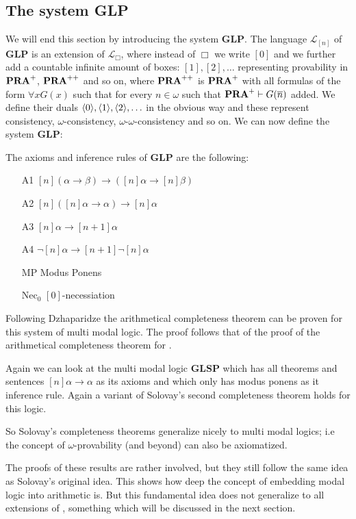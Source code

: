 \documentclass[../main.tex]{subfiles}
\begin{document}
\subsection{The system \textbf{GLP}}
We will end this section by introducing the system \textbf{GLP}.
The language $\mathcal{L}_{[n]}$ of \textbf{GLP} is an extension of
$\mathcal{L}_\Box$, where instead of $\Box$ we write $[0]$ and we further add
a countable infinite amount of boxes:
$[1],[2],\ldots$ representing provability in $\text{\textbf{PRA}}^+$, $\text{\textbf{PRA}}^{++}$ and so on,
where $\text{\textbf{PRA}}^{++}$ is  $\text{\textbf{PRA}}^+$ with all formulas of the form $\forall x G(x)$
such that for every $n\in\omega$ such that $\text{\textbf{PRA}}^+\vdash G(\overline n)$ added. We
define their duals $\langle 0\rangle,\langle 1\rangle, \langle 2\rangle,\ldots$ in the obvious way and
these represent consistency, $\omega$-consistency,
$\omega$-$\omega$-consistency and so on. We can now define the system
\textbf{GLP}:
\begin{defi}
	The axioms and inference rules of \textbf{GLP} are the following:
	\begin{enumerate}
		\item[A1]
			$[n](\alpha\rightarrow\beta)\rightarrow([n]\alpha\rightarrow[n]\beta)$
		\item[A2] $[n]([n]\alpha\rightarrow\alpha)\rightarrow[n]\alpha$
		\item[A3] $[n]\alpha\rightarrow[n+1]\alpha$
		\item[A4] $\neg[n]\alpha\rightarrow[n+1]\neg[n]\alpha$
		\item[MP] Modus Ponens
		\item[Nec$_0$] $[0]$-necessiation
	\end{enumerate}
\end{defi}

Following Dzhaparidze the arithmetical completeness theorem can be proven for
this system of multi modal logic. The proof follows that of the proof of the
arithmetical completeness theorem for \GLB.

Again we can look at the multi modal logic \textbf{GLSP} which has all
theorems and sentences $[n]\alpha\rightarrow\alpha$ as its axioms and which
only has modus ponens as it inference rule. Again a variant of Solovay's
second completeness theorem holds for this logic.

So Solovay's completeness theorems generalize nicely to multi modal logics;
i.e the concept of $\omega$-provability (and beyond) can also be axiomatized.


The proofs of these results are rather involved, but they still follow the same
idea as Solovay's original idea. This shows how deep the concept of embedding
modal logic into arithmetic is.
But this fundamental idea does not generalize to
all extensions of \GL, something which will be discussed in the next section.
\end{document}
